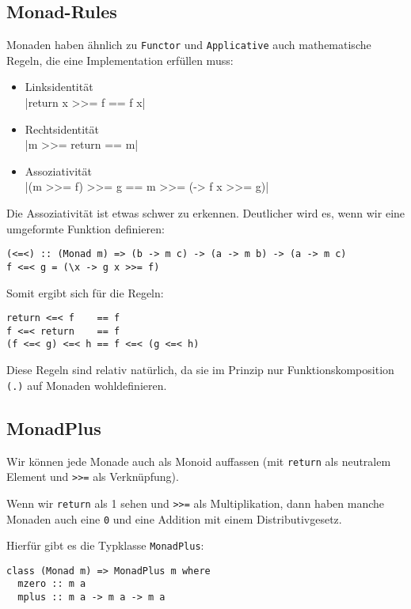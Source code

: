 \documentclass{beamer}
\begin{document}
\subsection{Monad-Rules}
\begin{frame}[fragile]
Monaden haben ähnlich zu \texttt{Functor} und \texttt{Applicative} auch mathematische Regeln, die eine Implementation erfüllen muss:\\
\begin{itemize}
 \item Linksidentität\\
       |return x >>= f == f x|
 \item Rechtsidentität\\
       |m >>= return == m|
 \item Assoziativität\\
       |(m >>= f) >>= g == m >>= (\x -> f x >>= g)|
\end{itemize}
\pause
Die Assoziativität ist etwas schwer zu erkennen. Deutlicher wird es, wenn wir eine umgeformte Funktion definieren:
\begin{verbatim}
(<=<) :: (Monad m) => (b -> m c) -> (a -> m b) -> (a -> m c)
f <=< g = (\x -> g x >>= f)
\end{verbatim}
\end{frame}

\begin{frame}[fragile]
Somit ergibt sich für die Regeln:\bigskip

\begin{verbatim}
return <=< f    == f
f <=< return    == f
(f <=< g) <=< h == f <=< (g <=< h)
\end{verbatim}
\pause
Diese Regeln sind relativ \glqq natürlich\grqq , da sie im Prinzip nur Funktionskomposition \texttt{(.)} auf Monaden wohldefinieren.
\end{frame}

\subsection{MonadPlus}
\begin{frame}[fragile]
Wir können jede Monade auch als Monoid auffassen (mit \texttt{return} als neutralem Element und \texttt{>>=} als Verknüpfung).\smallskip

\pause
Wenn wir \texttt{return} als 1 sehen und \texttt{>>=} als Multiplikation, dann haben manche Monaden auch eine \texttt{0} und eine Addition mit einem Distributivgesetz.\smallskip

Hierfür gibt es die Typklasse \texttt{MonadPlus}:
\begin{verbatim}
class (Monad m) => MonadPlus m where
  mzero :: m a
  mplus :: m a -> m a -> m a
\end{verbatim}
\end{frame}
\end{document}
